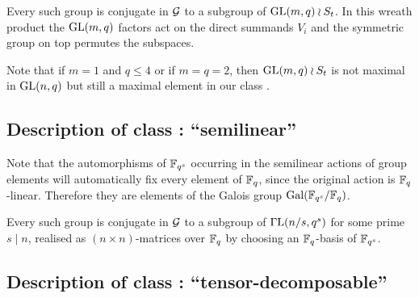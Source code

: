 \stru
Every such group is conjugate in $\mathcal{G}$ to a subgroup of $\GL(m,q) \wr S_t$.
In this wreath product the $\GL(m,q)$ factors act on the direct summands
$V_i$ and the symmetric group on top permutes the subspaces.

Note that if $m = 1$ and $q \le 4$ or if $m=q=2$, then $\GL(m,q) \wr S_t$
is not maximal in $\GL(n,q)$ but still a maximal element in our class
.

\subsection{Description of class : ``semilinear''}
\label{descC3}


Note that the automorphisms of $\mathbb{F}_{q^s}$ occurring in the semilinear
actions of group elements will automatically fix every element of $\mathbb{F}_q$, 
since the original action is $\mathbb{F}_q$-linear. Therefore they are elements of
the Galois group $\Gal(\F_{q^s}/\F_q)$.

\medskip
\stru
Every such group is conjugate in $\mathcal{G}$ to a subgroup of $\GGL(n/s,q^s)$
for some prime $s \mid n$, 
realised as $(n \times n)$-matrices over $\mathbb{F}_q$ by choosing an 
$\mathbb{F}_q$-basis of $\mathbb{F}_{q^s}$.

\subsection{Description of class : ``tensor-decomposable''}
\label{descC4}


